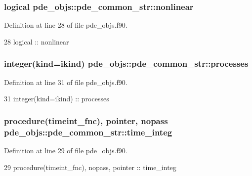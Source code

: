 \subsubsection[{nonlinear}]{\setlength{\rightskip}{0pt plus 5cm}logical pde\+\_\+objs\+::pde\+\_\+common\+\_\+str\+::nonlinear}\label{structpde__objs_1_1pde__common__str_afeccf9ae4d25ba1e604e9a753a790d28}


Definition at line 28 of file pde\+\_\+objs.\+f90.


\begin{DoxyCode}
28     \textcolor{keywordtype}{logical} :: nonlinear
\end{DoxyCode}
\subsubsection[{processes}]{\setlength{\rightskip}{0pt plus 5cm}integer(kind=ikind) pde\+\_\+objs\+::pde\+\_\+common\+\_\+str\+::processes}\label{structpde__objs_1_1pde__common__str_a7912e0e8c6d0e6658491584bd1788fa9}


Definition at line 31 of file pde\+\_\+objs.\+f90.


\begin{DoxyCode}
31     \textcolor{keywordtype}{integer(kind=ikind)}                              :: processes
\end{DoxyCode}
\subsubsection[{time\+\_\+integ}]{\setlength{\rightskip}{0pt plus 5cm}procedure({\bf timeint\+\_\+fnc}), pointer, nopass pde\+\_\+objs\+::pde\+\_\+common\+\_\+str\+::time\+\_\+integ}\label{structpde__objs_1_1pde__common__str_a24128930e63de4b14481971ba3bad2cc}


Definition at line 29 of file pde\+\_\+objs.\+f90.


\begin{DoxyCode}
29     \textcolor{keywordtype}{procedure}(timeint_fnc), \textcolor{keywordtype}{nopass}, \textcolor{keywordtype}{pointer}          :: time\_integ
\end{DoxyCode}
